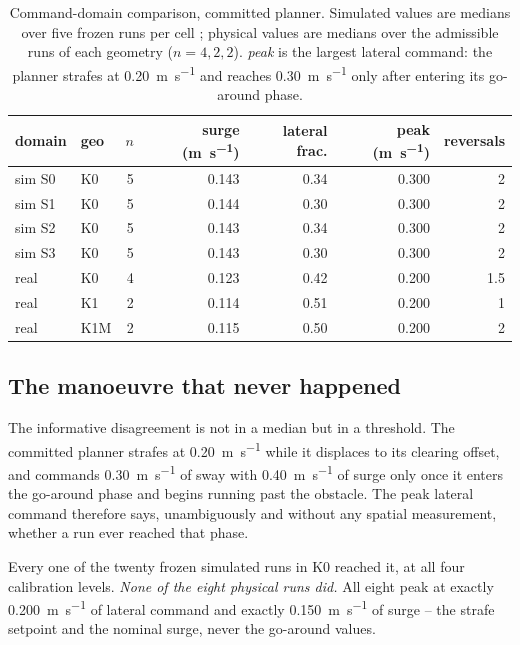 \begin{table}[t]
\centering
\caption{Command-domain comparison, committed planner. Simulated values
are medians over five frozen runs per cell \frozenmark; physical values
are medians over the admissible runs of each geometry \realmark
($n=4,2,2$). \emph{peak} is the largest lateral command: the planner
strafes at \SI{0.20}{\metre\per\second} and reaches
\SI{0.30}{\metre\per\second} only after entering its go-around phase.}
\label{tab:cmd}
\begin{tabular}{llrrrrr}
\toprule
domain & geo & $n$ & surge (\si{\metre\per\second}) & lateral frac.
& peak (\si{\metre\per\second}) & reversals \\
\midrule
sim S0 & K0 & 5 & 0.143 & 0.34 & 0.300 & 2 \\
sim S1 & K0 & 5 & 0.144 & 0.30 & 0.300 & 2 \\
sim S2 & K0 & 5 & 0.143 & 0.34 & 0.300 & 2 \\
sim S3 & K0 & 5 & 0.143 & 0.30 & 0.300 & 2 \\
\midrule
real & K0  & 4 & 0.123 & 0.42 & 0.200 & 1.5 \\
real & K1  & 2 & 0.114 & 0.51 & 0.200 & 1 \\
real & K1M & 2 & 0.115 & 0.50 & 0.200 & 2 \\
\bottomrule
\end{tabular}
\end{table}

\subsection{The manoeuvre that never happened}

The informative disagreement is not in a median but in a threshold. The
committed planner strafes at \SI{0.20}{\metre\per\second} while it
displaces to its clearing offset, and commands
\SI{0.30}{\metre\per\second} of sway with \SI{0.40}{\metre\per\second} of
surge only once it enters the go-around phase and begins running past
the obstacle. The peak lateral command therefore says, unambiguously and
without any spatial measurement, whether a run ever reached that phase.

Every one of the twenty frozen simulated runs in \textsf{K0} reached it,
at all four calibration levels. \emph{None of the eight physical runs
did.} All eight peak at exactly \SI{0.200}{\metre\per\second} of lateral
command and exactly \SI{0.150}{\metre\per\second} of surge -- the strafe
setpoint and the nominal surge, never the go-around values.

